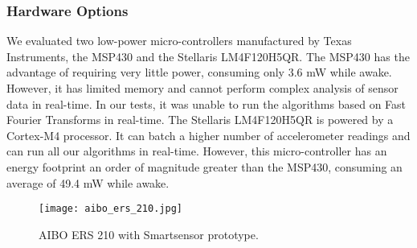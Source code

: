 \subsubsection{Hardware Options}

We evaluated two low-power micro-controllers manufactured by Texas
Instruments, the MSP430 and the Stellaris LM4F\-120H5QR.  The MSP430 has
the advantage of requiring very little power, consuming only 3.6 mW
while awake.  However, it has limited memory and cannot perform complex
analysis of sensor data in real-time.  In our tests, it was unable to
run the algorithms based on Fast Fourier Transforms in real-time.  
The Stellaris LM4F120H5QR is powered by a Cortex-M4 processor.  It can 
batch a higher number of accelerometer
readings and can run all our algorithms in real-time.  However, this
micro-controller has an energy footprint an order of magnitude greater
than the MSP430, consuming an average of 49.4 mW while awake.

\begin{figure}[t]
	\centering
	\texttt{[image: aibo\_ers\_210.jpg]}
	\caption{AIBO ERS 210 with Smartsensor prototype.}
	\label{fig:aibo}
\end{figure}

\fi
